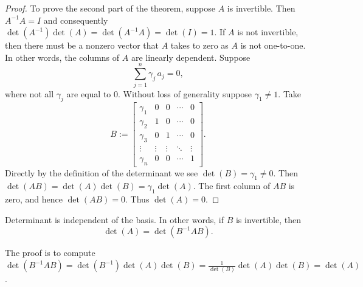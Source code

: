 \begin{proof}
To prove the second part of the theorem, suppose $A$ is invertible.
Then $A^{-1}A = I$ and consequently $\det(A^{-1})\det(A) = \det(A^{-1}A) = \det(I) = 1$.
If $A$ is not invertible, then there must be a nonzero vector that $A$ takes
to zero as $A$ is not one-to-one.  In other words, the columns of $A$ are linearly dependent.
Suppose 
\begin{equation*}
\sum_{j=1}^n \gamma_j\, a_j = 0 ,
\end{equation*}
where not all $\gamma_j$ are equal to 0.
Without loss of generality suppose $\gamma_1\neq 1$.
Take
\begin{equation*}
B := 
\begin{bmatrix}
\gamma_1 & 0 & 0 & \cdots & 0 \\
\gamma_2 & 1 & 0 & \cdots & 0 \\
\gamma_3 & 0 & 1 & \cdots & 0 \\
\vdots & \vdots & \vdots & \ddots & \vdots \\
\gamma_n & 0 & 0 & \cdots & 1
\end{bmatrix} .
\end{equation*}
Directly by the definition of the determinant
we see $\det(B) = \gamma_1 \not= 0$.
Then
$\det(AB) = \det(A)\det(B) = \gamma_1\det(A)$.
The first column of $AB$ is zero, and hence $\det(AB) = 0$.  Thus
$\det(A) = 0$.
\end{proof}

\begin{prop}
Determinant is independent of the basis.  In other words, if $B$ is
invertible, then
\begin{equation*}
\det(A) = \det(B^{-1}AB) .
\end{equation*}
\end{prop}

The proof is to compute
$\det(B^{-1}AB) = 
\det(B^{-1})\det(A)\det(B) =
\frac{1}{\det(B)}\det(A)\det(B) = \det(A)$.

